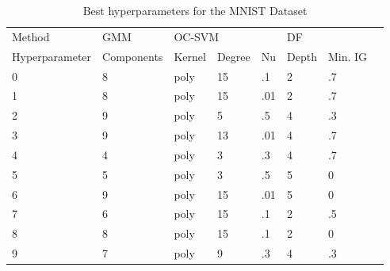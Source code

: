 \documentclass[10pt]{article}
\begin{document}
\begin{table}[H]
    \centering
    \begin{tabular}{@{}llllllll@{}}
    \toprule
    Method & \gls{GMM} & \multicolumn{3}{l}{\gls{OC-SVM}} & \multicolumn{3}{l}{\acrlong{DF}} \\ 
    Hyperparameter & Components & Kernel & Degree & Nu & Depth & Min. \gls{IG} \\\midrule
    0 & 8 & poly & 15 & .1  & 2 & .7  \\
    1 & 8 & poly & 15 & .01 & 2 & .7  \\
    2 & 9 & poly & 5  & .5  & 4 & .3  \\
    3 & 9 & poly & 13 & .01 & 4 & .7  \\
    4 & 4 & poly & 3  & .3  & 4 & .7  \\
    5 & 5 & poly & 3  & .5  & 5 &  0  \\
    6 & 9 & poly & 15 & .01 & 5 &  0  \\
    7 & 6 & poly & 15 & .1  & 2 & .5  \\
    8 & 8 & poly & 15 & .1  & 2 & 0   \\
    9 & 7 & poly & 9  & .3  & 4 & .3  \\ \bottomrule
    \end{tabular}
    \caption{Best hyperparameters for the \gls{MNIST} Dataset}
    \label{table:hyperparameters-results-mnist}
\end{table}
\end{document}
